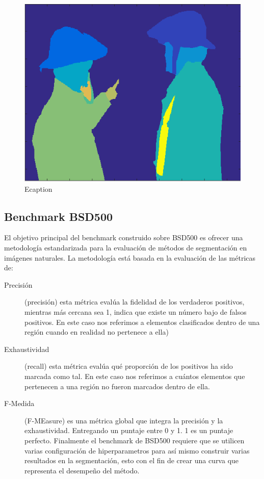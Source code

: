 \documentclass[10pt,twocolumn,letterpaper]{article}
\begin{document}
\begin{figure}

\includegraphics[width=0.85\linewidth]
                  {img/Imagesc.png}
  \caption{Ecaption}
\label{fig:short2}
\end{figure}

\subsection{Benchmark  BSD500}
El objetivo principal del benchmark construido sobre BSD500 es ofrecer una metodología estandarizada para la evaluación de métodos de segmentación en imágenes naturales. La metodología está basada en la evaluación de las métricas de:
\begin{description}


\item[Precisión] (precisión) esta métrica evalúa la fidelidad de los verdaderos positivos, mientras más cercana sea 1, indica que existe un número bajo de falsos positivos. En este caso nos referimos a elementos clasificados dentro de una región cuando en realidad no pertenece a ella)

\item[Exhaustividad] (recall) esta métrica evalúa qué proporción  de los positivos ha sido marcada como tal. En este caso nos referimos a cuántos elementos que pertenecen a una región no fueron marcados dentro de ella.

\item[F-Medida] (F-MEasure)  es una métrica global que integra la precisión y la exhaustividad. Entregando un puntaje entre 0 y 1. 1 es un puntaje perfecto.
Finalmente el benchmark de BSD500 requiere que se utilicen varias configuración de hiperparametros para así mismo construir varias resultados en la segmentación,  esto con el fin de crear una curva que representa el desempeño del método.
\end{description}
\end{document}
